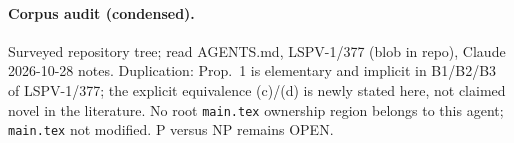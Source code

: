 \documentclass{article}
\begin{document}
\paragraph{Corpus audit (condensed).} Surveyed repository tree; read AGENTS.md, LSPV-1/377 (blob in repo), Claude 2026-10-28 notes. Duplication: Prop.~1 is elementary and implicit in B1/B2/B3 of LSPV-1/377; the explicit equivalence (c)/(d) is newly stated here, not claimed novel in the literature. No root \texttt{main.tex} ownership region belongs to this agent; \texttt{main.tex} not modified. P versus NP remains OPEN.
\end{document}
